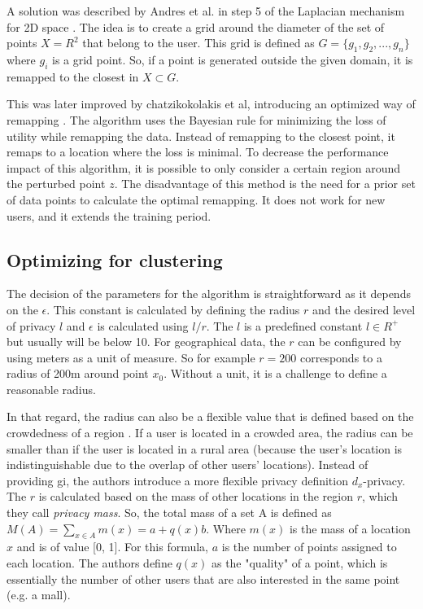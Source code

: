 A solution was described by Andres et al. in step 5 of the Laplacian mechanism for 2D space \citep{DBLP:journals/corr/abs-1212-1984}.
The idea is to create a grid around the diameter of the set of points $X = R^2$ that belong to the user.
This grid is defined as $G = \{g_1, g_2, ..., g_n\}$ where $g_i$ is a grid point.
So, if a point is generated outside the given domain, it is remapped to the closest in $X \subset G$.

This was later improved by chatzikokolakis et al, introducing an optimized way of remapping \citep{chatzikokolakis_practical_nodate}.
The algorithm uses the Bayesian rule for minimizing the loss of utility while remapping the data.
Instead of remapping to the closest point, it remaps to a location where the loss is minimal.
To decrease the performance impact of this algorithm, it is possible to only consider a certain region around the perturbed point $z$.
The disadvantage of this method is the need for a prior set of data points to calculate the optimal remapping.
It does not work for new users, and it extends the training period.

\subsection{Optimizing for clustering} \label{2d:optimizing}
The decision of the parameters for the algorithm is straightforward as it depends on the $\epsilon$. \label{paragraph:choosing-r}
This constant is calculated by defining the radius $r$ and the desired level of privacy $l$ and $\epsilon$ is calculated using $l/r$.
The $l$ is a predefined constant $l \in R^+$ but usually will be below 10.
For geographical data, the $r$ can be configured by using meters as a unit of measure.
So for example $r = 200$ corresponds to a radius of 200m around point $x_0$.
Without a unit, it is a challenge to define a reasonable radius.

In that regard, the radius can also be a flexible value that is defined based on the crowdedness of a region \citep{chatzikokolakis_constructing_2015}.
If a user is located in a crowded area, the radius can be smaller than if the user is located in a rural area (because the user's location is indistinguishable due to the overlap of other users' locations).
Instead of providing \gls{gi}, the authors introduce a more flexible privacy definition $d_x$-privacy.
The $r$ is calculated based on the mass of other locations in the region $r$, which they call \emph{privacy mass}.
So, the total mass of a set A is defined as $M(A) = \sum_{x \in A} m(x) = a + q(x)b$.
Where $m(x)$ is the mass of a location $x$ and is of value [0, 1].
For this formula, $a$ is the number of points assigned to each location.
The authors define $q(x)$ as the "quality" of a point, which is essentially the number of other users that are also interested in the same point (e.g. a mall).

